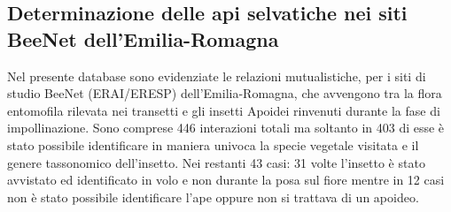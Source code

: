 \documentclass[main.tex]{subfiles}
\begin{document}
\subsection{Determinazione delle api selvatiche nei siti BeeNet dell’Emilia-Romagna}

Nel presente database sono evidenziate le relazioni mutualistiche, per i siti di studio BeeNet (ERAI/ERESP) dell’Emilia-Romagna, che avvengono tra la flora entomofila rilevata nei transetti e gli insetti Apoidei rinvenuti durante la fase di impollinazione. Sono comprese 446 interazioni totali ma soltanto in 403 di esse è stato possibile identificare in maniera univoca la specie vegetale visitata e il genere tassonomico dell’insetto. Nei restanti 43 casi: 31 volte l’insetto è stato avvistato ed identificato in volo e non durante la posa sul fiore mentre in 12 casi non è stato possibile identificare l’ape oppure non si trattava di un apoideo.
\end{document}
